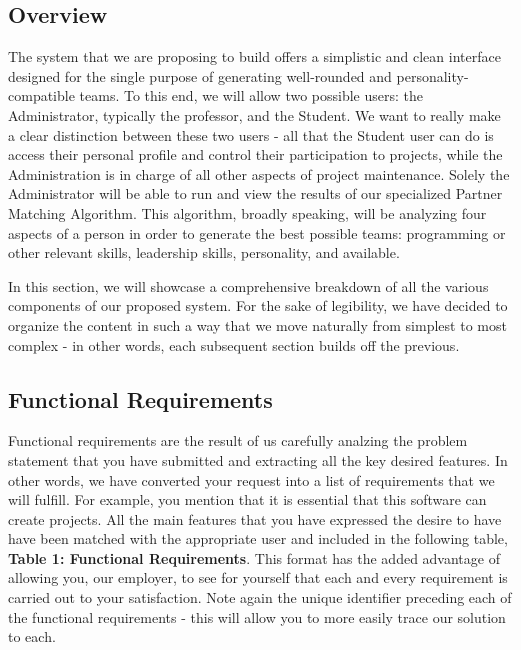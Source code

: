 \documentclass[12pt,letterpaper]{article}
\begin{document}
\subsection{Overview}

The system that we are proposing to build offers a simplistic and clean interface designed for the single purpose of generating 
well-rounded and personality-compatible teams. To this end, we will allow two possible users: the Administrator, typically the professor,
and the Student. We want to really make a clear distinction between these two users - all that the Student user can do is access their
personal profile and control their participation to projects, while the Administration is in charge of all other aspects of project maintenance. 
Solely the Administrator will be able to run and view the results of our specialized Partner Matching Algorithm. This algorithm, broadly speaking,
will be analyzing four aspects of a person in order to generate the best possible teams:  programming or other relevant skills, leadership skills,
personality, and available. 

In this section, we will showcase a comprehensive breakdown of all the various components of our proposed system. For the sake of 
legibility, we have decided to organize the content in such a way that we move naturally from simplest to most complex - in other words,
each subsequent section builds off the previous. 

\subsection{Functional Requirements}

Functional requirements are the result of us carefully analzing the problem statement that you have submitted and extracting all the key 
desired features. In other words, we have converted your request into a list of requirements that we will fulfill. For example, you mention that
it is essential that this software can create projects. All the main features that you have expressed the desire to have have been matched with
the appropriate user and included in the following table, {\bf Table 1: Functional Requirements}. This format has the added advantage of allowing you, our employer, to see for 
yourself that each and every requirement is carried out to your satisfaction. Note again the unique identifier preceding each of the functional 
requirements - this will allow you to more easily trace our solution to each. 
\end{document}
